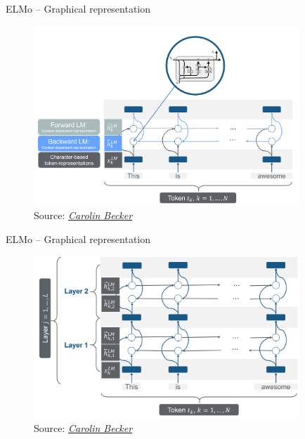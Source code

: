 \documentclass[]{beamer}
\begin{document}
\begin{frame}{ELMo -- Graphical representation}
	\begin{figure}
		\centering
		\includegraphics[width = 10cm]{figure/elmo-pretrained-bilm}\\ 
		\footnotesize{Source:} \href{https://compstat-lmu.github.io/seminar_nlp_ss20/transfer-learning-for-nlp-i.html}{\footnotesize \it Carolin Becker}
	\end{figure}
\end{frame}



\begin{frame}{ELMo -- Graphical representation}
	\begin{figure}
		\centering
		\includegraphics[width = 10cm]{figure/elmo-pretrained-bilm-2}\\ 
		\footnotesize{Source:} \href{https://compstat-lmu.github.io/seminar_nlp_ss20/transfer-learning-for-nlp-i.html}{\footnotesize \it Carolin Becker}
	\end{figure}
\end{frame}
\end{document}

